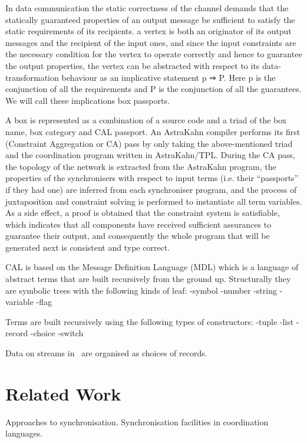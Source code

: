 In data communication the static correctness of the channel demands that the statically guaranteed properties of an output message be sufficient to satisfy the static requirements of its recipients.
a vertex is both an originator of its output messages and the recipient of the input ones, and since the input constraints are the necessary condition for the vertex to operate correctly and hence to guarantee the output properties, the vertex can be abstracted with
respect to its data-transformation behaviour as an implicative statement p ⇒ P. Here p is the conjunction of all the requirements and P is the conjunction of all the guarantees. We will call these implications box passports.

A box is represented as a combination of a source code and a triad of the box name, box category and CAL passport. An AstraKahn compiler performs its first (Constraint Aggregation or CA) pass by only taking the above-mentioned triad and the coordination program written in AstraKahn/TPL. During the CA pass, the topology of the network is extracted from the AstraKahn program, the properties of the synchronisers with respect to input terms (i.e. their “passports” if they had one) are inferred from each synchroniser program, and the process of juxtaposition and constraint solving is performed to instantiate all term variables. As a side effect, a proof is obtained that the constraint system is satisfiable, which indicates that all components have received sufficient assurances to guarantee their output, and consequently the whole program that will be generated next is consistent and type correct.

CAL is based on the Message Definition Language (MDL) which is a language of abstract terms that are built recursively from the ground up. Structurally they are symbolic trees with the following kinds of leaf:
-symbol
-number
-string
-variable
-flag

Terms are built recursively using the following types of constructors:
-tuple
-list
-record
-choice
-switch


Data on streams in \ak\ are organised as choices of records.




\chapter{Related Work}
Approaches to synchronisation.
Synchronisation facilities in coordination languages.
